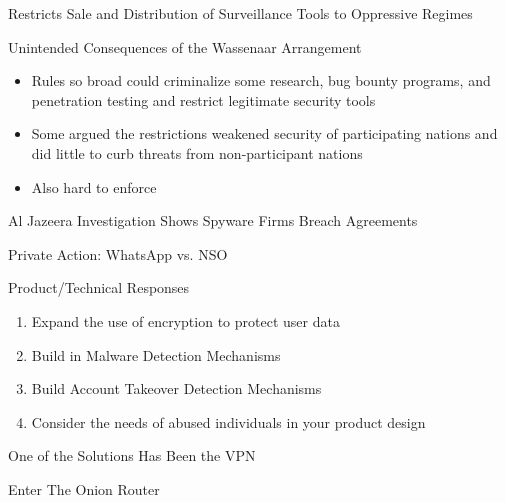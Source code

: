 \documentclass[nobackground,dvipsnames,table]{beamer}
\begin{document}
\begin{frame}{Restricts Sale and Distribution of Surveillance Tools to Oppressive Regimes}
\end{frame}

\begin{frame}{Unintended Consequences of the Wassenaar Arrangement}
    \begin{itemize}
        \item Rules so broad could criminalize some research, bug bounty programs, and penetration testing and restrict legitimate security tools 
        \item Some argued the restrictions weakened security of participating nations and did little to curb threats from non-participant nations
        \item Also hard to enforce 
    \end{itemize}
\end{frame}

\begin{frame}{Al Jazeera Investigation Shows Spyware Firms Breach Agreements}
\end{frame}

\begin{frame}{Private Action: WhatsApp vs. NSO }
\end{frame}

\begin{frame}{Product/Technical Responses}
    \begin{enumerate}
        \item Expand the use of encryption to protect user data
        \item Build in Malware Detection Mechanisms
        \item Build Account Takeover Detection Mechanisms
        \item Consider the needs of abused individuals in your product design
    \end{enumerate}
\end{frame}

\begin{frame}{One of the Solutions Has Been the VPN}
\end{frame}

\begin{frame}{Enter The Onion Router}
\end{frame}
\end{document}

